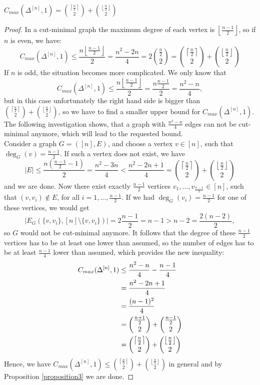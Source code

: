 \begin{thm}\label{theorem1}
\(C_{max}(\Delta^{[n]},1)=\binom{\left\lceil\frac{n}{2}\right\rceil}{2}+\binom{\left\lfloor\frac{n}{2}\right\rfloor}{2}\)
\begin{proof}
In a cut-minimal graph the maximum degree of each vertex is \(\left\lfloor\frac{n-1}{2}\right\rfloor\), so if \(n\) is even, we have:
\[
C_{max}(\Delta^{[n]},1)\leq\frac{n\left\lfloor\frac{n-1}{2}\right\rfloor}{2}=\frac{n^2-2n}{4}=2\binom{\frac{n}{2}}{2}=\binom{\left\lceil\frac{n}{2}\right\rceil}{2}+\binom{\left\lfloor\frac{n}{2}\right\rfloor}{2}
\]
If \(n\) is odd, the situation becomes more complicated. We only know that
\[
C_{max}(\Delta^{[n]},1)\leq\frac{n\left\lfloor\frac{n-1}{2}\right\rfloor}{2}=\frac{n\frac{n-1}{2}}{2}=\frac{n^2-n}{4},
\]
but in this case unfortunately the right hand side is bigger than \(\binom{\left\lceil\frac{n}{2}\right\rceil}{2}+\binom{\left\lfloor\frac{n}{2}\right\rfloor}{2}\), so we have to find a smaller upper bound for \(C_{max}(\Delta^{[n]},1)\). The following investigation shows, that a graph with \(\frac{n^2-n}{4}\) edges can not be cut-minimal anymore, which will lead to the requested bound.\\
Consider a graph \(G=([n],E)\), and choose a vertex \(v\in [n]\), such that\\
\(\deg_G(v)=\frac{n-1}{2}\). If such a vertex does not exist, we have
\[
|E|\leq\frac{n(\frac{n-1}{2}-1)}{2}=\frac{n^2-3n}{4}<\frac{n^2-2n+1}{4}=\binom{\left\lceil\frac{n}{2}\right\rceil}{2}+\binom{\left\lfloor\frac{n}{2}\right\rfloor}{2}
\]
and we are done. Now there exist exactly \(\frac{n-1}{2}\) vertices \(v_1,\ldots,v_{\frac{n-1}{2}}\in [n]\), such that \((v,v_i)\notin E\), for all \(i=1,\ldots,\frac{n-1}{2}\). If we had \(\deg_G(v_i)=\frac{n-1}{2}\) for one of these vertices, we would get
\[
|E_G(\{v,v_i\},[n]\setminus\{v,v_i\})|=2\frac{n-1}{2}=n-1>n-2=\frac{2(n-2)}{2},
\]
so \(G\) would not be cut-minimal anymore. It follows that the degree of these \(\frac{n-1}{2}\) vertices has to be at least one lower than assumed, so the number of edges has to be at least \(\frac{n-1}{4}\) lower than assumed, which provides the new inequality:
\begin{align}
C_{max}(\Delta^{[n]},1)&\leq\frac{n^2-n}{4}-\frac{n-1}{4}\notag\\
&=\frac{n^2-2n+1}{4}\notag\\
&=\frac{(n-1)^2}{4}\notag\\
&=\binom{\frac{n+1}{2}}{2}+\binom{\frac{n-1}{2}}{2}\notag\\
&=\binom{\left\lceil\frac{n}{2}\right\rceil}{2}+\binom{\left\lfloor\frac{n}{2}\right\rfloor}{2}\notag
\end{align}
Hence, we have \(C_{max}(\Delta^{[n]},1)\leq\binom{\left\lceil\frac{n}{2}\right\rceil}{2}+\binom{\left\lfloor\frac{n}{2}\right\rfloor}{2}\) in general and by Proposition \ref{proposition3} we are done.
\end{proof}
\end{thm}
